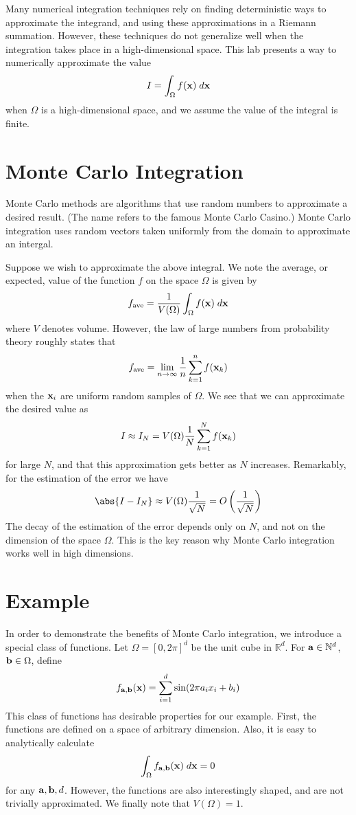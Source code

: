 \newcommand{\fab}{f_{{\bf a},{\bf b}}}


Many numerical integration techniques rely on finding deterministic ways to
approximate the integrand, and using these approximations in a Riemann
summation. However, these techniques do not generalize well when the integration
takes place in a high-dimensional space. This lab presents a way to numerically
approximate the value
\[I = \int_{\Omega} f({\bf x}) \;d{\bf x} \]
when $\Omega$ is a high-dimensional space, and we assume the value of the
integral is finite.

\section*{Monte Carlo Integration}
Monte Carlo methods are algorithms that use random numbers to approximate a
desired result. (The name refers to the famous Monte Carlo Casino.) Monte Carlo
integration uses random vectors taken uniformly from the domain to approximate
an intergal.

Suppose we wish to approximate the above integral. We note the average, or
expected, value of the function $f$ on the space $\Omega$ is given by
\[f_{\text{ave}} = \frac{1}{V(\Omega)}\int_{\Omega} f({\bf x}) \;d{\bf x} \]
where $V$ denotes volume. However, the law of large numbers from probability
theory roughly states that
\[f_{\text{ave}} = \lim_{n \to \infty} \frac{1}{n} \sum_{k=1}^{n} f({\bf x}_k) \]
when the ${\bf x}_i$ are uniform random samples of $\Omega$. We see that we can
approximate the desired value as
\[I \approx I_N = V(\Omega)\frac{1}{N}\sum_{k=1}^{N} f({\bf x}_k) \]
for large $N$, and that this approximation gets better as $N$ increases.
Remarkably, for the estimation of the error we have
\[\abs{I - I_N} \approx V(\Omega)\frac{1}{\sqrt{N}} =
O\left(\frac{1}{\sqrt{N}}\right) \] 
The decay of the estimation of the error depends only on $N$, and not on the
dimension of the space $\Omega$. This is the key reason why Monte Carlo
integration works well in high dimensions.

\section*{Example}

In order to demonstrate the benefits of Monte Carlo integration, we introduce a
special class of functions. Let $\Omega = [0,2 \pi ]^d$ be the unit cube in
$\mathbb{R}^d$. For ${\bf a} \in \mathbb{N}^d$, ${\bf b} \in \Omega$, define
\[\fab({\bf x}) = \sum_{i=1}^{d} \sin(2\pi a_i x_i + b_i) \]
This class of functions has desirable properties for our example. First, the
functions are defined on a space of arbitrary dimension. Also, it is easy
to analytically calculate
\[\int_{\Omega} \fab({\bf x}) \; d {\bf x} = 0 \]
for any ${\bf a}, {\bf b}, d$. However, the functions are also interestingly
shaped, and are not trivially approximated. We finally note that $V(\Omega) = 1$.


